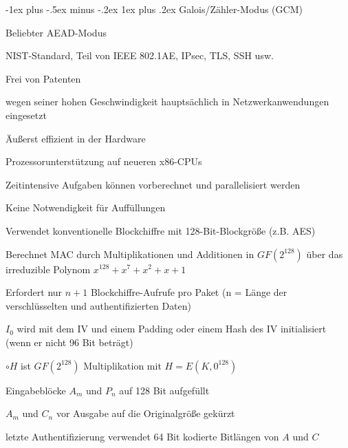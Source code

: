 \documentclass[a4paper]{article}
\makeatletter
\renewcommand{\subsubsection}{\@startsection{subsubsection}{3}{0mm}%
 {-1ex plus -.5ex minus -.2ex}%
 {1ex plus .2ex}%
 {\normalfont\small\bfseries}}
\makeatother
\begin{document}
\begin{multicols}{3}
      \subsubsection{Galois/Zähler-Modus (GCM)}
      \begin{itemize*}
            \item Beliebter AEAD-Modus
            \item NIST-Standard, Teil von IEEE 802.1AE, IPsec, TLS, SSH usw.
            \item Frei von Patenten
            \item wegen seiner hohen Geschwindigkeit hauptsächlich in Netzwerkanwendungen eingesetzt
            \begin{itemize*}
                  \item Äußerst effizient in der Hardware
                  \item Prozessorunterstützung auf neueren x86-CPUs
                  \item Zeitintensive Aufgaben können vorberechnet und parallelisiert werden
                  \item Keine Notwendigkeit für Auffüllungen
            \end{itemize*}
            \item Verwendet konventionelle Blockchiffre mit 128-Bit-Blockgröße (z.B. AES)
            \item Berechnet MAC durch Multiplikationen und Additionen in $GF(2^{128})$ über das irreduzible Polynom $x^{128}+x^{7}+x^{2}+x+1$
            \item Erfordert nur $n+1$ Blockchiffre-Aufrufe pro Paket (n = Länge der verschlüsselten und authentifizierten Daten)
            \begin{itemize*}
                  \item $I_0$ wird mit dem IV und einem Padding oder einem Hash des IV initialisiert (wenn er nicht 96 Bit beträgt)
                  \item $\circ H$ ist $GF(2^{128})$ Multiplikation mit $H=E(K,0^{128})$
                  \item Eingabeblöcke $A_m$ und $P_n$ auf 128 Bit aufgefüllt
                  \item $A_m$ und $C_n$ vor Ausgabe auf die Originalgröße gekürzt
                  \item letzte Authentifizierung verwendet 64 Bit kodierte Bitlängen von $A$ und $C$
            \end{itemize*}

\end{itemize*}
\end{multicols}
\end{document}
